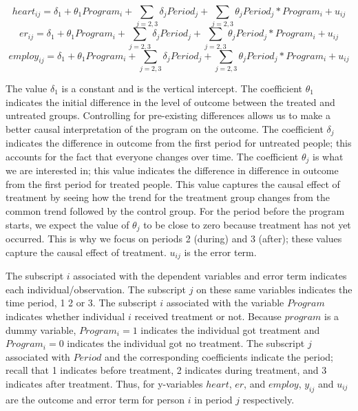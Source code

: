 \documentclass[a4paper]{article}
\begin{document}
\begin{equation}
heart_{ij} = \delta_1 + \theta_1 Program_i + \sum_{j=2,3} \delta_j Period_j + \sum_{j=2,3} \theta_j Period_j * Program_i + u_{ij}
\end{equation}
\begin{equation}
er_{ij} = \delta_1 + \theta_1 Program_i + \sum_{j=2,3} \delta_j Period_j + \sum_{j=2,3} \theta_j Period_j * Program_i + u_{ij}
\end{equation}
\begin{equation}
employ_{ij} = \delta_1 + \theta_1 Program_i + \sum_{j=2,3} \delta_j Period_j + \sum_{j=2,3} \theta_j Period_j * Program_i + u_{ij}
\end{equation}

The value $\delta_1$ is a constant and is the vertical intercept. The coefficient $\theta_1$ indicates the initial difference in the level of outcome between the treated and untreated groups. Controlling for pre-existing differences allows us to make a better causal interpretation of the program on the outcome. The coefficient $\delta_j$ indicates the difference in outcome from the first period for untreated people; this accounts for the fact that everyone changes over time. The coefficient $\theta_j$ is what we are interested in; this value indicates the difference in difference in outcome from the first period for treated people. This value captures the causal effect of treatment by seeing how the trend for the treatment group changes from the common trend followed by the control group. For the period before the program starts, we expect the value of $\theta_j$ to be close to zero because treatment has not yet occurred. This is why we focus on periods 2 (during) and 3 (after); these values capture the causal effect of treatment. $u_{ij}$ is the error term.

The subscript $i$ associated with the dependent variables and error term indicates each individual/observation. The subscript $j$ on these same variables indicates the time period, 1 2 or 3. The subscript $i$ associated with the variable \(Program\) indicates whether individual $i$ received treatment or not. Because \(program\) is a dummy variable, $Program_i = 1$ indicates the individual got treatment and $Program_i = 0$ indicates the individual got no treatment. The subscript $j$ associated with \(Period\) and the corresponding coefficients indicate the period; recall that 1 indicates before treatment, 2 indicates during treatment, and 3 indicates after treatment. Thus, for y-variables $heart$, $er$, and $employ$, $y_{ij}$ and $u_{ij}$ are the outcome and error term for person $i$ in period $j$ respectively.
\end{document}
